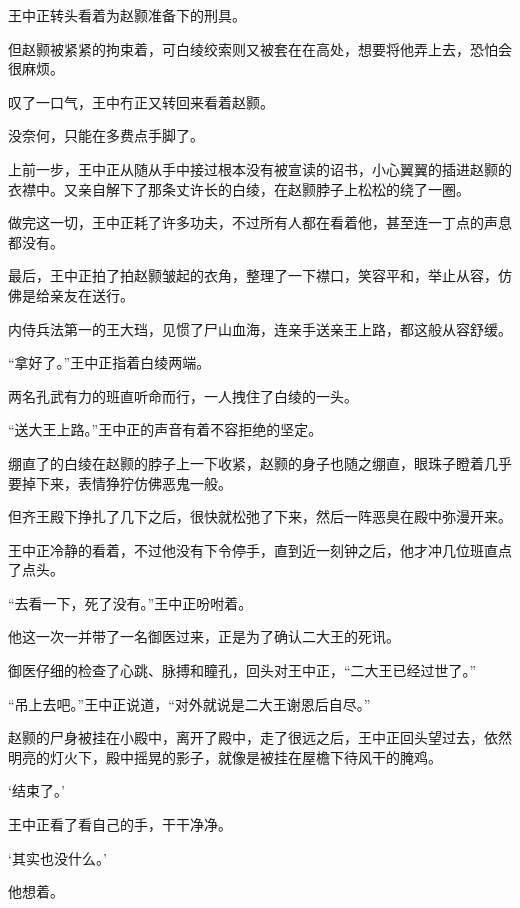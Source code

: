 王中正转头看着为赵颢准备下的刑具。

但赵颢被紧紧的拘束着，可白绫绞索则又被套在在高处，想要将他弄上去，恐怕会很麻烦。

叹了一口气，王中冇正又转回来看着赵颢。

没奈何，只能在多费点手脚了。

上前一步，王中正从随从手中接过根本没有被宣读的诏书，小心翼翼的插进赵颢的衣襟中。又亲自解下了那条丈许长的白绫，在赵颢脖子上松松的绕了一圈。

做完这一切，王中正耗了许多功夫，不过所有人都在看着他，甚至连一丁点的声息都没有。

最后，王中正拍了拍赵颢皱起的衣角，整理了一下襟口，笑容平和，举止从容，仿佛是给亲友在送行。

内侍兵法第一的王大珰，见惯了尸山血海，连亲手送亲王上路，都这般从容舒缓。

“拿好了。”王中正指着白绫两端。

两名孔武有力的班直听命而行，一人拽住了白绫的一头。

“送大王上路。”王中正的声音有着不容拒绝的坚定。

绷直了的白绫在赵颢的脖子上一下收紧，赵颢的身子也随之绷直，眼珠子瞪着几乎要掉下来，表情狰狞仿佛恶鬼一般。

但齐王殿下挣扎了几下之后，很快就松弛了下来，然后一阵恶臭在殿中弥漫开来。

王中正冷静的看着，不过他没有下令停手，直到近一刻钟之后，他才冲几位班直点了点头。

“去看一下，死了没有。”王中正吩咐着。

他这一次一并带了一名御医过来，正是为了确认二大王的死讯。

御医仔细的检查了心跳、脉搏和瞳孔，回头对王中正，“二大王已经过世了。”

“吊上去吧。”王中正说道，“对外就说是二大王谢恩后自尽。”

赵颢的尸身被挂在小殿中，离开了殿中，走了很远之后，王中正回头望过去，依然明亮的灯火下，殿中摇晃的影子，就像是被挂在屋檐下待风干的腌鸡。

‘结束了。’

王中正看了看自己的手，干干净净。

‘其实也没什么。’

他想着。

